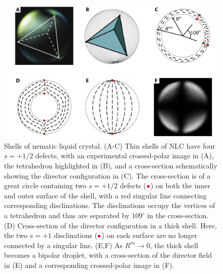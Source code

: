 \begin{figure}
  \centering
  \includegraphics{figures/C1/Ch1-Figs_Shells.png}
  \caption{Shells of nematic liquid crystal.
  (A-C) Thin shells of NLC have four $s = +1/2$ defects, with an experimental crossed-polar image in (A), the tetrahedron highlighted in (B), and a cross-section schematically showing the director configuration in (C).
  The cross-section is of a great circle containing two $s = +1/2$ defects (${\color{red} \bullet}$) on both the inner and outer surface of the shell, with a red singular line connecting corresponding disclinations.
  The disclinations occupy the vertices of a tetrahedron and thus are separated by $109^{\circ}$ in the cross-section.
  (D) Cross-section of the director configuration in a thick shell. Here, the two $s = +1$ disclinations (${\color{red} \bullet}$) on each surface are no longer connected by a singular line.
  (E,F) As $R^{in}\rightarrow 0$, the thick shell becomes a bipolar droplet, with a cross-section of the director field in (E) and a corresponding crossed-polar image in (F).}\label{f:1-Shells}
\end{figure}

